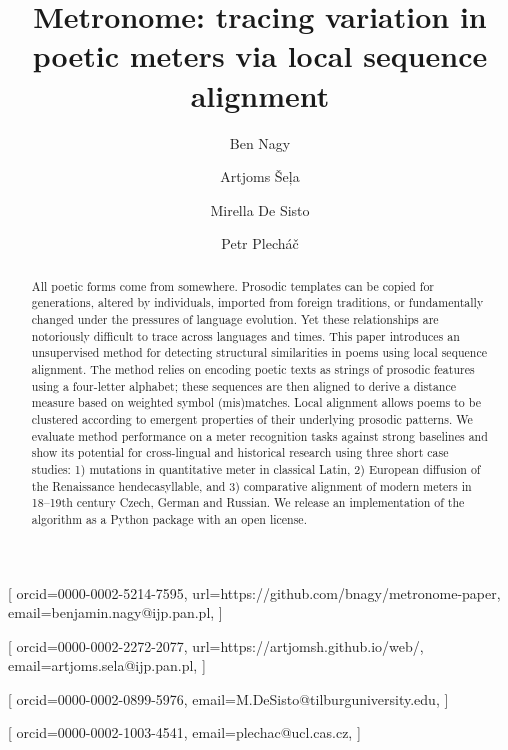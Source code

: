 \documentclass[
    hf
]{ceurart}
\begin{document}

\conference{}
\title{Metronome: tracing variation in poetic meters via local sequence alignment}


\author[1]{Ben Nagy}[%
    orcid=0000-0002-5214-7595,
    url=https://github.com/bnagy/metronome-paper,
    email=benjamin.nagy@ijp.pan.pl,
]

\author[1]{Artjoms Šeļa}[%
    orcid=0000-0002-2272-2077,
    url=https://artjomsh.github.io/web/,
    email=artjoms.sela@ijp.pan.pl,
]

\author[2]{Mirella {De Sisto}}[%
    orcid=0000-0002-0899-5976,
    email=M.DeSisto@tilburguniversity.edu,
]

\author[3]{Petr Plecháč}[%
    orcid=0000-0002-1003-4541,
    email=plechac@ucl.cas.cz,
]

\address[1]{Institute of Polish Language, Polish Academy of Sciences (IJP PAN), Kraków}

\address[2]{Tilburg University}

\address[3]{Institute of Czech Literature, Czech Academy of Sciences, Prague}

\begin{abstract}
    All poetic forms come from somewhere. Prosodic templates can be copied for generations, altered by individuals, imported from foreign traditions, or fundamentally changed under the pressures of language evolution. Yet these relationships are notoriously difficult to trace across languages and times. This paper introduces an unsupervised method for detecting structural similarities in poems using local sequence alignment. The method relies on encoding poetic texts as strings of prosodic features using a four-letter alphabet; these sequences are then aligned to derive a distance measure based on weighted symbol (mis)matches. Local alignment allows poems to be clustered according to emergent properties of their underlying prosodic patterns. We evaluate method performance on a meter recognition tasks against strong baselines and show its potential for cross-lingual and historical research using three short case studies: 1) mutations in quantitative meter in classical Latin, 2) European diffusion of the Renaissance hendecasyllable, and  3) comparative alignment of modern meters in 18--19th century Czech, German and Russian. We release an implementation of the algorithm as a Python package with an open license.
\end{abstract}
\end{document}
